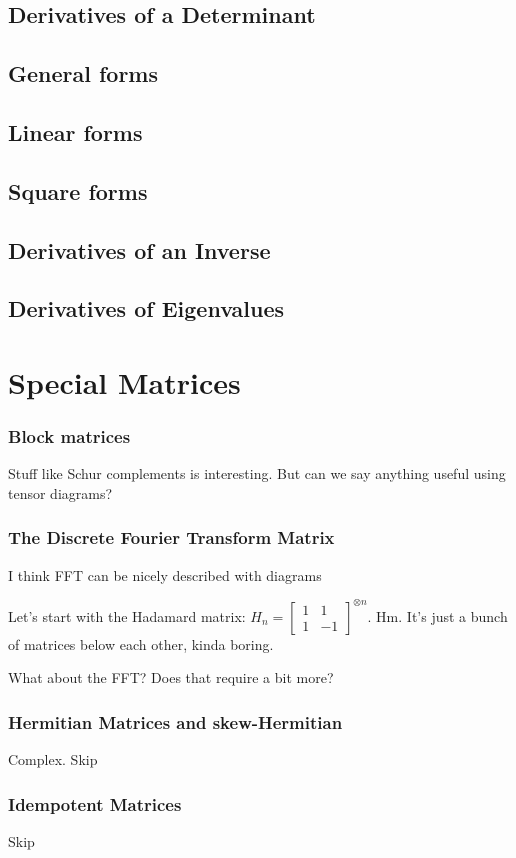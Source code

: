 \documentclass[oneside]{book}
\newcommand{\smat}[1]{\left[\begin{smallmatrix}#1\end{smallmatrix}\right]}
\begin{document}
\section{Derivatives of a Determinant}
\section{General forms}
\section{Linear forms}
\section{Square forms}


\section{Derivatives of an Inverse}
\section{Derivatives of Eigenvalues}


\chapter{Special Matrices}
\subsection{Block matrices}
Stuff like Schur complements is interesting.
But can we say anything useful using tensor diagrams?

\subsection{The Discrete Fourier Transform Matrix}
I think FFT can be nicely described with diagrams

Let's start with the Hadamard matrix:
$H_n = \smat{1 & 1 \\ 1 & -1}^{\otimes n}$.
Hm. It's just a bunch of matrices below each other, kinda boring.

What about the FFT?
Does that require a bit more?

\subsection{Hermitian Matrices and skew-Hermitian}
Complex. Skip
\subsection{Idempotent Matrices}
Skip
\end{document}
